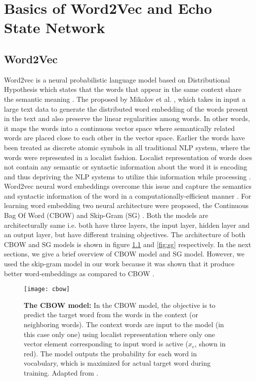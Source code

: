 \chapter{Basics of Word2Vec and Echo State Network}\label{basics}

\section{Word2Vec}

Word2vec is a neural probabilistic language model based on Distributional Hypothesis which states that the words that appear in the same context share the semantic meaning \cite{w2v:tensor_flow}. The proposed by Mikolov et al. \cite{w2v:mikolov_2013_distributed}, which takes in input a large text data to generate the distributed word  embedding of the words present in the text and also preserve the linear regularities among words. In other words, it maps the words into a continuous vector space where semantically related words are placed close to each other in the vector space. Earlier the words have been treated as discrete atomic symbols in all traditional NLP system, where the words were represented in a localist fashion. Localist representation of words does not contain any semantic or syntactic information about the word it is encoding and thus depriving the NLP systems to utilize this information while processing \cite{w2v:baroni:2014}. Word2vec neural word embeddings overcome this issue and capture the semantics and syntactic information of the word in a computationally-efficient manner \cite{w2v:mikolov_2013_efficient}. For learning word embedding two neural architecture were proposed, the Continuous Bag Of Word (CBOW) and Skip-Gram (SG) \cite{w2v:mikolov_2013_efficient, w2v:mikolov_2013_distributed}. Both the models are architecturally same i.e. both have three layers, the input layer, hidden layer and an output layer, but have different training objectives. The architecture of both CBOW and SG models is shown in figure \ref{fig:cbow} and \ref{fig:sg} respectively. In the next sections, we give a brief overview of CBOW model and SG model. However, we used the skip-gram model in our work because it was shown that it produce better word-embeddings as compared to CBOW \cite{w2v:mikolov_2013_distributed}.

\begin{figure}[hbtp]
\centering
\texttt{[image: cbow]}
\caption[The CBOW model]{\textbf{The CBOW model: } In the CBOW model, the objective is to predict the target word from the words in the context (or neighboring words). The context words are input to the model (in this case only one) using localist representation where only one vector element corresponding to input word is active ($x_{c}$, shown in red). The model outputs the probability for each word in vocabulary, which is maximized for actual target word during training. Adapted from \cite{w2v:parameter_learning}.}
\label{fig:cbow}
\end{figure}

